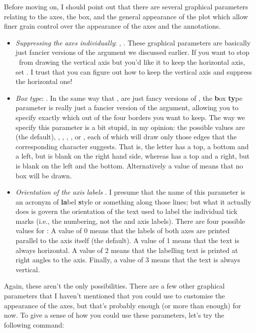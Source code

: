 Before moving on, I should point out that there are several graphical parameters relating to the axes, the box, and the general appearance of the plot which allow finer grain control over the appearance of the axes and the annotations. 
\begin{itemize}
\item {\it Suppressing the axes individually}: , . These graphical parameters are basically just fancier versions of the  argument we discussed earlier. If you want to stop \R\ from drawing the vertical axis but you'd like it to keep the horizontal axis, set . I trust that you can figure out how to keep the vertical axis and suppress the horizontal one!
\item {\it Box type}: . In the same way that ,  are just fancy versions of , the {\bf b}ox {\bf ty}pe parameter is really just a fancier version of the  argument, allowing you to specify exactly which out of the four borders you want to keep. The way we specify this parameter is a bit stupid, in my opinion: the  possible values are  (the default), , , , , or \rtext{"]"}, each of which will draw only those edges that the corresponding character suggests. That is, the letter  has a top, a bottom and a left, but is blank on the right hand side, whereas  has a top and a right, but is blank on the left and the bottom. Alternatively a value of  means that no box will be drawn.
\item {\it Orientation of the axis labels} . I presume that the name of this parameter is an acronym of {\bf la}bel {\bf s}tyle or something along those lines; but what it actually does is govern the orientation of the text used to label the individual tick marks (i.e., the numbering, not the  and  axis labels). There are four possible values for : A value of 0 means that the labels of both axes are printed parallel to the axis itself (the default). A value of 1 means that the text is always horizontal. A value of 2 means that the labelling text is printed at right angles to the axis. Finally, a value of 3 means that the text is always vertical. 
\end{itemize}
Again, these aren't the only possibilities. There are a few other graphical parameters that I haven't mentioned that you could use to customise the appearance of the axes, but that's probably enough (or more than enough) for now. To give a sense of how you could use these parameters, let's try the following command:
